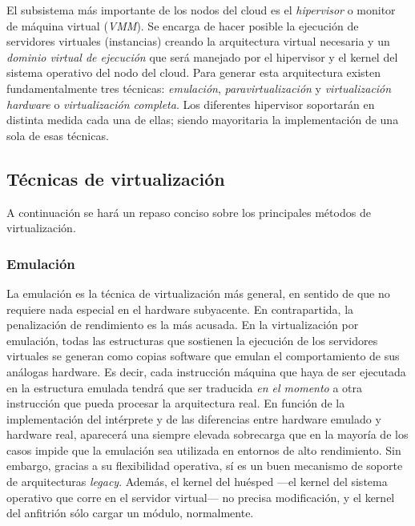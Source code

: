 El subsistema m\'as importante de los nodos del cloud es el \emph{hipervisor} o monitor de m\'aquina virtual (\emph{VMM}). Se encarga de hacer posible la ejecuci\'on de servidores virtuales (instancias) creando la arquitectura virtual necesaria y un \emph{dominio virtual de ejecuci\'on} que ser\'a manejado por el hipervisor y el kernel del sistema operativo del nodo del cloud. Para generar esta arquitectura existen fundamentalmente tres t\'ecnicas: \emph{emulaci\'on}, \emph{paravirtualizaci\'on} y \emph{virtualizaci\'on hardware} o \emph{virtualizaci\'on completa}. Los diferentes hipervisor soportar\'an en distinta medida cada una de ellas; siendo mayoritaria la implementaci\'on de una sola de esas t\'ecnicas.\newline

\subsection{T\'ecnicas de virtualizaci\'on}\label{subsec:tecnicasemu}

\noindent A continuaci\'on se har\'a un repaso conciso sobre los principales m\'etodos de virtualizaci\'on.

\subsubsection{Emulaci\'on}\label{subsubsec:emulacion}

\noindent La emulaci\'on es la t\'ecnica de virtualizaci\'on m\'as general, en sentido de que no requiere nada especial en el hardware subyacente. En contrapartida, la penalizaci\'on de rendimiento es la m\'as acusada. En la virtualizaci\'on por emu\-la\-ci\'on, todas las estructuras que sostienen la ejecuci\'on de los servidores virtuales se generan como copias software que emulan el comportamiento de sus an\'alogas hardware. Es decir, cada instrucci\'on m\'aquina que haya de ser ejecutada en la estructura emulada tendr\'a que ser traducida \emph{en el momento} a otra instrucci\'on que pueda procesar la arquitectura real. En funci\'on de la implementaci\'on del int\'erprete y de las diferencias entre hardware emulado y hardware real, aparecer\'a una siempre elevada sobrecarga que en la ma\-yo\-r\'i\-a de los casos impide que la emulaci\'on sea utilizada en entornos de alto rendimiento. Sin embargo, gracias a su flexibilidad operativa, s\'i es un buen mecanismo de soporte de arquitecturas \emph{legacy}. Adem\'as, el kernel del hu\'esped ---el kernel del sistema operativo que corre en el servidor virtual--- no precisa modificaci\'on, y el kernel del anfitri\'on s\'olo cargar un m\'odulo, normalmente.\newline


